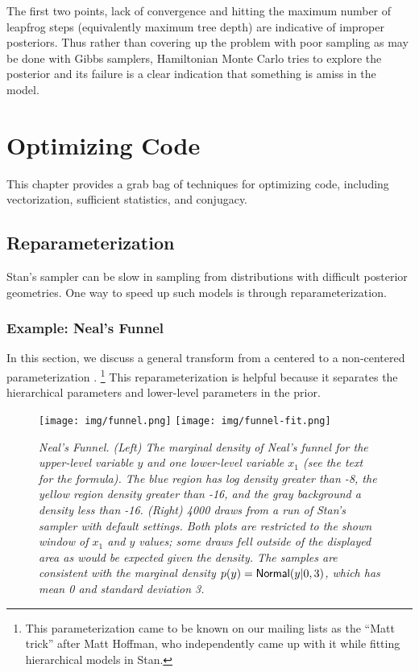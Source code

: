 %
The first two points, lack of convergence and hitting the maximum
number of leapfrog steps (equivalently maximum tree depth) are
indicative of improper posteriors.  Thus rather than covering up the
problem with poor sampling as may be done with Gibbs samplers,
Hamiltonian Monte Carlo tries to explore the posterior and its failure
is a clear indication that something is amiss in the model.





\chapter{Optimizing \Stan Code}\label{optimization.chapter}
\noindent
This chapter provides a grab bag of techniques for optimizing \Stan
code, including vectorization, sufficient statistics, and conjugacy.

\section{Reparameterization}\label{reparameterization.section}

Stan's sampler can be slow in sampling from distributions with
difficult posterior geometries.  One way to speed up such models is
through reparameterization.  

\subsection{Example: Neal's Funnel}

In this section, we discuss a general transform from a centered to a
non-centered parameterization \cite{papa-et-al:2007}.%
%
\footnote{This parameterization came to be known on our mailing lists
  as the ``Matt trick'' after Matt Hoffman, who independently came up
  with it while fitting hierarchical models in Stan.}
%
This reparameterization is helpful because it separates the
hierarchical parameters and lower-level parameters in the prior.
%
\begin{figure}[t]
\vspace*{-6pt}
\begin{center}
\texttt{[image: img/funnel.png]}
\texttt{[image: img/funnel-fit.png]}
\end{center}
\vspace*{-18pt}
\caption{\small\it Neal's Funnel.  (Left) The marginal density of
  Neal's funnel for the upper-level variable $y$ and one lower-level
  variable $x_1$ (see the text for the formula).  The blue region has
  log density greater than -8, the yellow region density greater than
  -16, and the gray background a density less than -16.  
  (Right) 4000 draws from a run of Stan's
  sampler with default settings.  Both plots are restricted to the
  shown window of $x_1$ and $y$ values; some draws fell outside of
  the displayed area as would be expected given the density.  The samples are
  consistent with the marginal density $p(y) =
  \mbox{\sf Normal}(y|0,3)$, which has mean 0 and standard deviation
  3.}\label{funnel.figure}
\end{figure}

